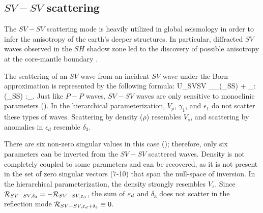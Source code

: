 \subsection{$SV-SV$ scattering}
The $SV-SV$ scattering mode is heavily utilized in global seismology in order to infer the anisotropy of the earth's deeper structures. In particular, diffracted $SV$ waves observed in the $SH$ shadow zone led to the discovery of possible anisotropy at the core-mantle boundary \citep{vinnik1989,babuska1991,vinnik1995}.

The scattering of an $SV$ wave from an incident $SV$ wave under the Born approximation is represented by the following formula:
\beq \label{eq:USVSV}
\delta U_{SVSV} \equiv   
 \sv_\theta \cdot \gv_\phi \delta \hat{\rho}(\Kv_{SS}) + 
%
\sv\sv_\phi : \delta \hat{\cv}(\Kv_{SS}) :\gv\gv_{\phi}.
\eeq 
Just like $P-P$ waves, $SV-SV$ waves are only sensitive to monoclinic parameters 
(). In the hierarchical parameterization, $V_p$, $\gamma_1$, and $\epsilon_1$ do not scatter these types of waves. Scattering by density ($\rho$) resembles $V_s$, and scattering by anomalies in $\epsilon_d$ resemble $\delta_3$.


%

There are six non-zero singular values in this case (); therefore, only six parameters can be inverted from the $SV-SV$ scattered waves. Density is not completely coupled to some parameters and can be recovered, as it is not present in the set of zero singular vectors (7-10) that span the null-space of inversion. In the hierarchical parameterization, the density strongly resembles $V_s$. 
Since $\mathcal{R}_{SV-SV,\delta_3} = -\mathcal{R}_{SV-SV,\varepsilon_d}$,
the sum of $\varepsilon_d$ and $\delta_3$ does not scatter in the reflection mode
$\mathcal{R}_{SV-SV,\varepsilon_d+\delta_3}\equiv 0$.


